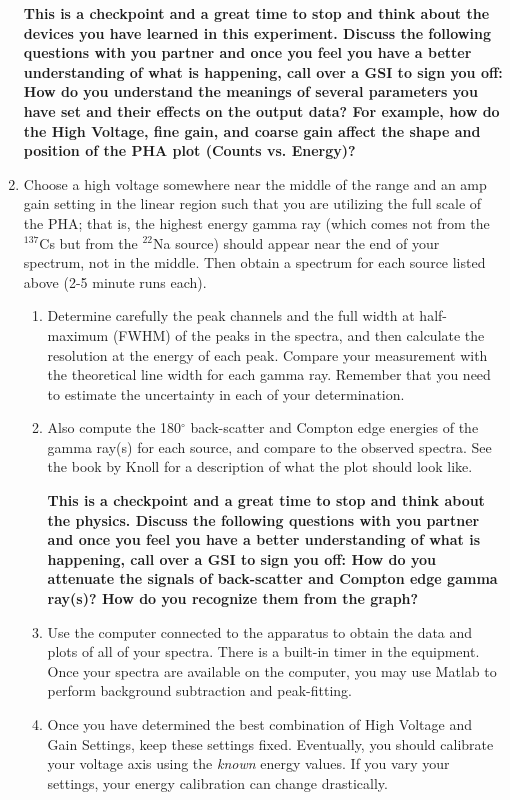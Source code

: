\documentclass{../lab}
\begin{document}
\begin{enumerate}
    \textbf{This is a checkpoint and a great time to stop and think about the devices you have learned in this experiment. Discuss the following questions with you partner and once you feel you have a better understanding of what is happening, call over a GSI to sign you off: How do you understand the meanings of several parameters you have set and their effects on the output data? For example, how do the High Voltage, fine gain, and coarse gain affect the shape and position of the PHA plot (Counts vs. Energy)?}

    \item Choose a high voltage somewhere near the middle of the range and an amp gain setting in the linear region such that you are utilizing the full scale of the PHA; that is, the highest energy gamma ray (which comes not from the $^{137}$Cs but from the $^{22}$Na source) should appear near the end of your spectrum, not in the middle. Then obtain a spectrum for each source listed above (2-5 minute runs each).
    \begin{enumerate}
        \item Determine carefully the peak channels and the full width at half-maximum (FWHM) of the peaks in the spectra, and then calculate the resolution at the energy of each peak. Compare your measurement with the theoretical line width for each gamma ray. Remember that you need to estimate the uncertainty in each of your determination.

        \item Also compute the 180$^\circ$ back-scatter and Compton edge energies of the gamma ray(s) for each source, and compare to the observed spectra. See the book by Knoll for a description of what the plot should look like.
        
        \textbf{This is a checkpoint and a great time to stop and think about the physics. Discuss the following questions with you partner and once you feel you have a better understanding of what is happening, call over a GSI to sign you off: How do you attenuate the signals of back-scatter and Compton edge gamma ray(s)? How do you recognize them from the graph?}

        \item Use the computer connected to the apparatus to obtain the data and plots of all of your spectra. There is a built-in timer in the equipment. Once your spectra are available on the computer, you may use Matlab to perform background subtraction and peak-fitting.

        \item Once you have determined the best combination of High Voltage and Gain Settings, keep these settings fixed. Eventually, you should calibrate your voltage axis using the \emph{known} energy values. If you vary your settings, your energy calibration can change drastically.


\end{enumerate}
\end{enumerate}
\end{document}

